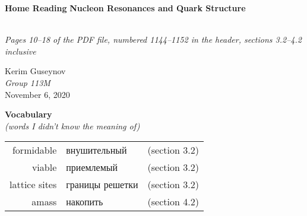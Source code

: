 \documentclass[a4paper, 12pt]{article}
\begin{document}
\begin{center}
	\begin{large}
		\textbf{Home Reading} \linebreak
		\textbf{Nucleon Resonances and Quark Structure}
	\end{large}
	\\\textit{\small Pages 10--18 of the PDF file, numbered 1144--1152 in the header, sections 3.2--4.2 inclusive}

	Kerim Guseynov \\
	\textit{Group 113M} \\
	November 6, 2020
\end{center}

\begin{center}
	\textbf{Vocabulary}
	\\\textit{\small (words I didn't know the meaning of)}
	\par\begin{tabular}{r@{ --- }l c}
		formidable    & внушительный    & (section 3.2) \\
		viable        & приемлемый      & (section 3.2) \\
		lattice sites & границы решетки & (section 3.2) \\
		amass         & накопить        & (section 4.2) \\
	\end{tabular}
\end{center}
\end{document}
